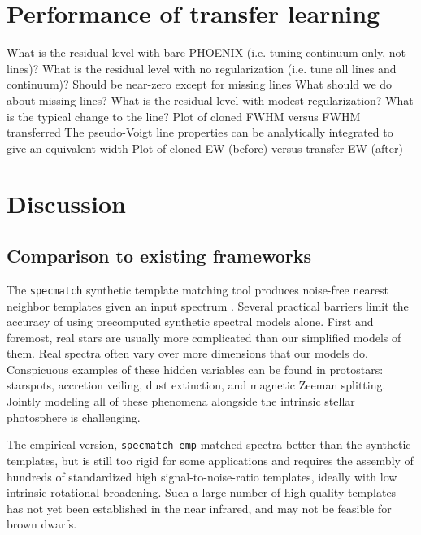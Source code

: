 \documentclass[modern]{aastex631}
\begin{document}
\section{Performance of transfer learning}
\begin{outline}
    \1 What is the residual level with bare PHOENIX (i.e. tuning continuum only, not lines)?
    \1 What is the residual level with no regularization (i.e. tune all lines and continuum)?
    \2 Should be near-zero except for missing lines
    \2 What should we do about missing lines?
    \1 What is the residual level with modest regularization? What is the typical change to the line?
    \2 Plot of cloned FWHM versus FWHM transferred
    \2 The pseudo-Voigt line properties can be analytically integrated to give an equivalent width
    \2 Plot of cloned EW (before) versus transfer EW (after)
\end{outline}

\section{Discussion}

\subsection{Comparison to existing frameworks}

The \texttt{specmatch} synthetic template matching tool produces noise-free nearest neighbor templates given an input spectrum \citep{2015PhDT........82P}.  Several practical barriers limit the accuracy of using precomputed synthetic spectral models alone. First and foremost, real stars are usually more complicated than our simplified models of them. Real spectra often vary over more dimensions that our models do.  Conspicuous examples of these hidden variables can be found in protostars: starspots, accretion veiling, dust extinction, and magnetic Zeeman splitting. Jointly modeling all of these phenomena alongside the intrinsic stellar photosphere is challenging.

The empirical version, \texttt{specmatch-emp} \citep{2017ApJ...836...77Y} matched spectra better than the synthetic templates, but is still too rigid for some applications and requires the assembly of hundreds of standardized high signal-to-noise-ratio templates, ideally with low intrinsic rotational broadening.  Such a large number of high-quality templates has not yet been established in the near infrared, and may not be feasible for brown dwarfs.
\end{document}
